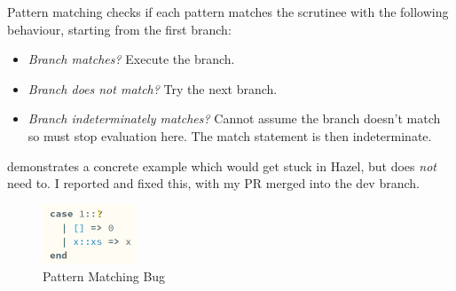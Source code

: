 Pattern matching checks if each pattern matches the scrutinee with the following behaviour, starting from the first branch:
\begin{itemize}
\item \textit{Branch matches?} Execute the branch.
\item \textit{Branch does not match?} Try the next branch.
\item \textit{Branch indeterminately matches?} Cannot assume the branch doesn't match so must stop evaluation here. The match statement is then indeterminate.
\end{itemize}
 demonstrates a concrete example which would get stuck in Hazel, but does \textit{not} need to. I reported and fixed this, with my PR merged into the dev branch.

\begin{figure}[H]
\centering
\includegraphics[width=0.25\textwidth]{Media/Figures/unboxing_bug}
\caption{Pattern Matching Bug}
\label{fig:PatternMatchingBug}
\end{figure}


